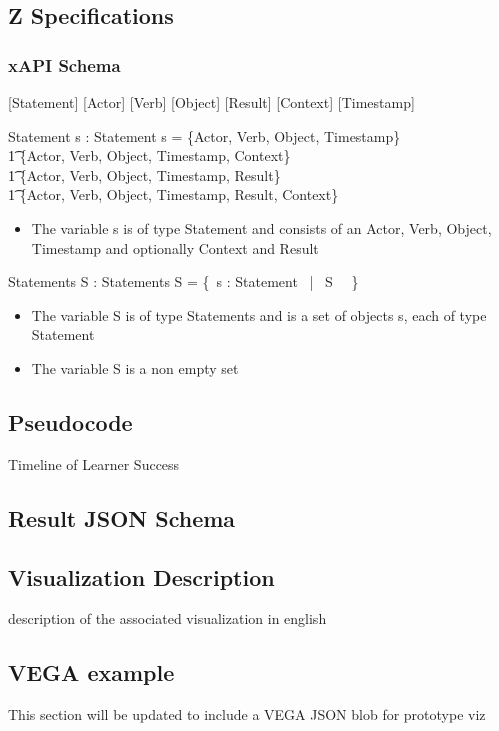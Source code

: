 \documentclass{article}
\begin{document}
  \subsection{Z Specifications}
  \subsubsection{xAPI Schema}
  [Statement]
  [Actor]
  [Verb]
  [Object]
  [Result]
  [Context]
  [Timestamp]
  \begin{schema}{Statement}
    s : Statement
    \where
    s = \{Actor, Verb, Object, Timestamp\} \, \lor
    \\ \t1 \{Actor, Verb, Object, Timestamp, Context\} \, \lor
    \\ \t1 \{Actor, Verb, Object, Timestamp, Result\} \, \lor
    \\ \t1 \{Actor, Verb, Object, Timestamp, Result, Context\}
  \end{schema}
  \begin{itemize}
  \item The variable s is of type Statement and consists of an Actor, Verb, Object, Timestamp and optionally Context and Result
  \end{itemize}
  \begin{schema}{Statements}
    S : Statements
    \where
    S = \{~s : Statement \, | \, S \, \neg \, \emptyset\} \\
  \end{schema}
  \begin{itemize}
  \item The variable S is of type Statements and is a set of objects s, each of type Statement
  \item The variable S is a non empty set
  \end{itemize}

  \subsection{Pseudocode}
  \begin{algorithm}[H]
    \SetAlgoLined
    \caption{Timeline of Learner Success}
  \end{algorithm}
  \subsection{Result JSON Schema}
  \subsection{Visualization Description}
  description of the associated visualization in english
  \subsection{VEGA example}
  This section will be updated to include a VEGA JSON blob for prototype viz
\end{document}
